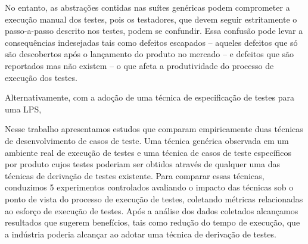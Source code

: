 No entanto, as abstrações contidas nas suítes genéricas podem comprometer a
execução manual dos testes, pois os testadores, que devem seguir estritamente o
passo-a-passo descrito nos testes, podem se confundir. Essa confusão pode levar
a consequências indesejadas tais como defeitos escapados -- aqueles defeitos que
só são descobertos após o lançamento do produto no mercado -- e defeitos que são
reportados mas não existem -- o que afeta a produtividade do processo de
execução dos testes.

Alternativamente, com a adoção de uma técnica de especificação de testes para
uma LPS,

 Nesse trabalho
apresentamos estudos que comparam empiricamente duas técnicas de desenvolvimento de casos de teste. Uma técnica genérica observada em um ambiente
real de execução de testes e uma técnica de casos de teste específicos por
produto cujos testes poderiam ser obtidos através de qualquer uma das técnicas
de derivação de testes existente. Para comparar essas técnicas, conduzimos 5
experimentos controlados avaliando o impacto das técnicas sob o ponto de vista
do processo de execução de testes, coletando métricas relacionadas ao esforço
de execução de testes. Após a análise dos dados coletados alcançamos resultados
que sugerem benefícios, tais como redução do tempo de execução, que
a indústria poderia alcançar ao adotar uma técnica de derivação de testes.




